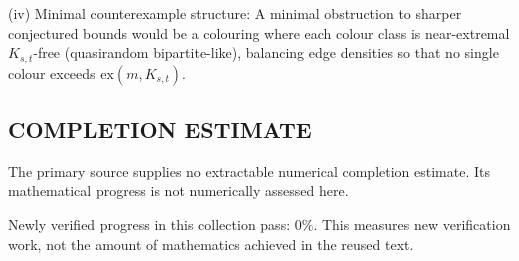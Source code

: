 (iv) Minimal counterexample structure:
A minimal obstruction to sharper conjectured bounds would be a colouring where each colour class is near-extremal $K_{s,t}$-free (quasirandom bipartite-like), balancing edge densities so that no single colour exceeds $\mathrm{ex}(m,K_{s,t})$.



\subsection*{COMPLETION ESTIMATE}
The primary source supplies no extractable numerical completion estimate. Its mathematical progress is not numerically assessed here.

Newly verified progress in this collection pass: $0\%$. This measures new verification work, not the amount of mathematics achieved in the reused text.
